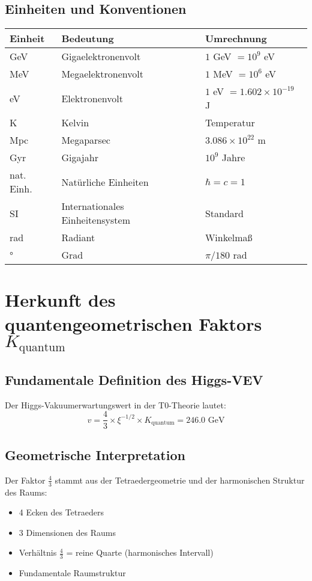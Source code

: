 \documentclass[12pt,a4paper]{article}
\begin{document}
	\subsection{Einheiten und Konventionen}
	
	\begin{longtable}{lll}
		\toprule
		\textbf{Einheit} & \textbf{Bedeutung} & \textbf{Umrechnung} \\
		\midrule
		GeV & Gigaelektronenvolt & $1$ GeV $= 10^9$ eV \\
		MeV & Megaelektronenvolt & $1$ MeV $= 10^6$ eV \\
		eV & Elektronenvolt & $1$ eV $= 1.602 \times 10^{-19}$ J \\
		K & Kelvin & Temperatur \\
		Mpc & Megaparsec & $3.086 \times 10^{22}$ m \\
		Gyr & Gigajahr & $10^9$ Jahre \\
		nat. Einh. & Natürliche Einheiten & $\hbar = c = 1$ \\
		SI & Internationales Einheitensystem & Standard \\
		rad & Radiant & Winkelmaß \\
		° & Grad & $\pi/180$ rad \\
		\bottomrule
	\end{longtable}
	
	\section{Herkunft des quantengeometrischen Faktors $K_{\text{quantum}}$}
	
	\subsection{Fundamentale Definition des Higgs-VEV}
	
	Der Higgs-Vakuumerwartungswert in der T0-Theorie lautet:
	\begin{equation}
		v = \frac{4}{3} \times \xi^{-1/2} \times K_{\text{quantum}} = 246.0 \text{ GeV}
	\end{equation}
	
	\subsection{Geometrische Interpretation}
	
	Der Faktor $\frac{4}{3}$ stammt aus der Tetraedergeometrie und der harmonischen Struktur des Raums:
	\begin{itemize}
		\item 4 Ecken des Tetraeders
		\item 3 Dimensionen des Raums
		\item Verhältnis $\frac{4}{3}$ = reine Quarte (harmonisches Intervall)
		\item Fundamentale Raumstruktur
	\end{itemize}
	
\end{document}
